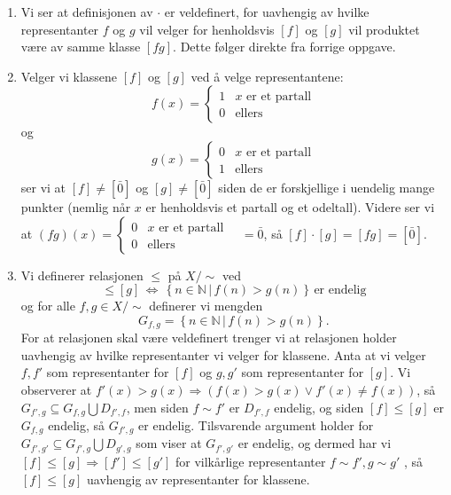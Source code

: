 \documentclass{article}[norsk]
\begin{document}
\begin{enumerate}[label=(\roman*)]
    \item %
    Vi ser at definisjonen av $\cdot$ er veldefinert, for uavhengig av hvilke representanter $f$ og $g$ vil velger for henholdsvis $[f]$ og $[g]$ vil produktet være av samme klasse $[fg]$. Dette følger direkte fra forrige oppgave.
    \item Velger vi klassene $[f]$ og $[g]$ ved å velge representantene:
    \begin{equation*}
    	f(x)=\begin{cases}
        	1 	&x \text{ er et partall}\\
            0	&\text{ellers}
        \end{cases}
    \end{equation*}
    og 
    \begin{equation*}
    g(x)=\begin{cases}
    	0	&x \text{ er et partall}\\
        1	&\text{ellers}
    \end{cases}
    \end{equation*}
    ser vi at $[f]\neq[\bar{0}]$ og $[g]\neq[\bar{0}]$ siden de er forskjellige i uendelig mange punkter (nemlig når $x$ er henholdsvis et partall og et odeltall). Videre ser vi at $\displaystyle (fg)(x)=\begin{cases}0&x\text{ er et partall}\\0&\text{ellers}\end{cases} \quad= \bar{0}$, så $[f]\cdot[g]=[fg]=[\bar{0}]$. 
    \item %
    Vi definerer relasjonen $\leq$ på $X/\sim$ ved
    \begin{equation*}
    	[f]\leq[g]\,\Longleftrightarrow\,\left\{n \in \mathbb{N}\, |\, f(n) > g(n)\right\}\,\text{er endelig}
    \end{equation*}
    og for alle $f,g\in X/\sim$ definerer vi mengden
    \begin{equation*}
    	G_{f,g}=\left\{n\in\mathbb{N}\,|\,f(n) > g(n)\right\}.
    \end{equation*} 
    For at relasjonen skal være veldefinert trenger vi at relasjonen holder uavhengig av hvilke representanter vi velger for klassene. Anta at vi velger $f,f'$ som representanter for $[f]$ og $g,g'$ som representanter for $[g]$. Vi observerer at  $f'(x)>g(x)\Rightarrow \left( f(x)>g(x)\vee f'(x)\neq f(x) \right)$, så $G_{f',g}\subseteq G_{f,g}\bigcup D_{f',f}$, men siden $f\sim f'$ er $D_{f',f}$ endelig, og siden $[f]\leq [g]$ er $G_{f,g}$ endelig, så $G_{f',g}$ er endelig. Tilsvarende argument holder for $G_{f',g'}\subseteq G_{f',g}\bigcup D_{g',g}$ som viser at $G_{f',g'}$ er endelig, og dermed har vi $[f]\leq[g]\Rightarrow [f']\leq[g']$ for vilkårlige representanter $f\sim f',g\sim g'$ , så $[f]\leq[g]$ uavhengig av representanter for klassene.
    

\end{enumerate}
\end{document}
